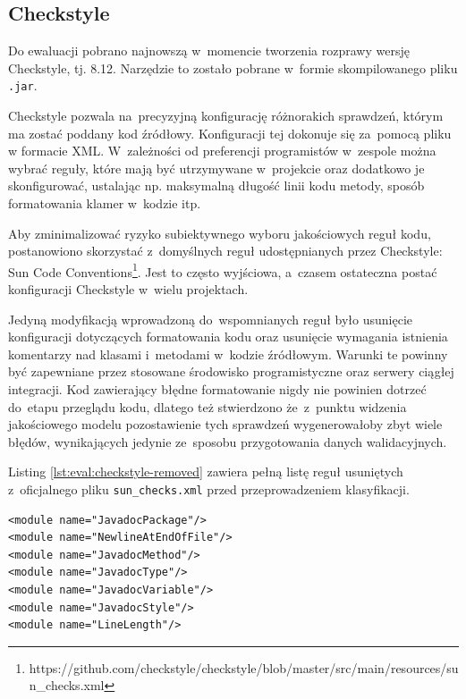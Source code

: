 \documentclass[twoside]{praca}
\begin{document}
\subsection{Checkstyle}
Do ewaluacji pobrano najnowszą w~momencie tworzenia rozprawy wersję Checkstyle, tj. 8.12. Narzędzie to zostało pobrane w~formie skompilowanego pliku \texttt{.jar}. 

Checkstyle pozwala na~precyzyjną konfigurację różnorakich sprawdzeń, którym ma zostać poddany kod źródłowy. Konfiguracji tej dokonuje się za~pomocą pliku w formacie XML. W~zależności od preferencji programistów w~zespole można wybrać reguły, które mają być utrzymywane w~projekcie oraz dodatkowo je skonfigurować, ustalając np. maksymalną długość linii kodu metody, sposób formatowania klamer w~kodzie itp.

Aby zminimalizować ryzyko subiektywnego wyboru jakościowych reguł kodu, postanowiono skorzystać z~domyślnych reguł udostępnianych przez Checkstyle: Sun Code Conventions\footnote{https://github.com/checkstyle/checkstyle/blob/master/src/main/resources/sun\_checks.xml}. Jest to często wyjściowa, a~czasem ostateczna postać konfiguracji Checkstyle w~wielu projektach.

Jedyną modyfikacją wprowadzoną do~wspomnianych reguł było usunięcie konfiguracji dotyczących formatowania kodu oraz usunięcie wymagania istnienia komentarzy nad klasami i~metodami w~kodzie źródłowym. Warunki te powinny być zapewniane przez stosowane środowisko programistyczne oraz serwery ciągłej integracji. Kod zawierający błędne formatowanie nigdy nie powinien dotrzeć do~etapu przeglądu kodu, dlatego też stwierdzono że~z~punktu widzenia jakościowego modelu pozostawienie tych sprawdzeń wygenerowałoby zbyt wiele błędów, wynikających jedynie ze~sposobu przygotowania danych walidacyjnych.

Listing \ref{lst:eval:checkstyle-removed} zawiera pełną listę reguł usuniętych z~oficjalnego pliku \texttt{sun\_checks.xml} przed przeprowadzeniem klasyfikacji.

\begin{lstlisting}[frame=single,caption={Reguły usunięte z~Sun Code Conventions przed klasyfikacją kodu za~pomocą Checkstyle},captionpos=b,label={lst:eval:checkstyle-removed}]
<module name="JavadocPackage"/>
<module name="NewlineAtEndOfFile"/>
<module name="JavadocMethod"/>
<module name="JavadocType"/>
<module name="JavadocVariable"/>
<module name="JavadocStyle"/>
<module name="LineLength"/>
\end{lstlisting}
\end{document}
